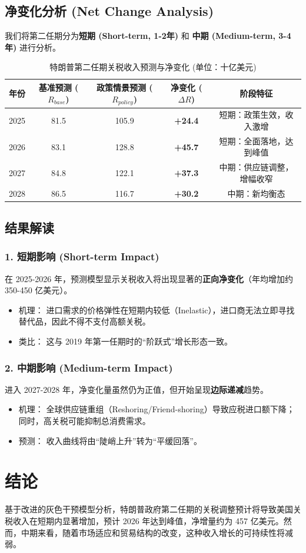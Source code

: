 \documentclass[a4paper,12pt]{article}
\begin{document}
\subsection{净变化分析 (Net Change Analysis)}

我们将第二任期分为\textbf{短期 (Short-term, 1-2年)} 和 \textbf{中期 (Medium-term, 3-4年)} 进行分析。

\begin{table}[H]
    \centering
    \caption{特朗普第二任期关税收入预测与净变化 (单位：十亿美元)}
    \label{tab:prediction}
    \begin{tabular}{ccccc}
        \toprule
        \textbf{年份} & \textbf{基准预测 ($R_{base}$)} & \textbf{政策情景预测 ($R_{policy}$)} & \textbf{净变化 ($\Delta R$)} & \textbf{阶段特征} \\
        \midrule
        2025 & 81.5 & 105.9 & \textbf{+24.4} & 短期：政策生效，收入激增 \\
        2026 & 83.1 & 128.8 & \textbf{+45.7} & 短期：全面落地，达到峰值 \\
        2027 & 84.8 & 122.1 & \textbf{+37.3} & 中期：供应链调整，增幅收窄 \\
        2028 & 86.5 & 116.7 & \textbf{+30.2} & 中期：新均衡态 \\
        \bottomrule
    \end{tabular}
\end{table}

\subsection{结果解读}

\subsubsection{1. 短期影响 (Short-term Impact)}
在 2025-2026 年，预测模型显示关税收入将出现显著的\textbf{正向净变化}（年均增加约 350-450 亿美元）。
\begin{itemize}
    \item 机理： 进口需求的价格弹性在短期内较低（Inelastic），进口商无法立即寻找替代品，因此不得不支付高额关税。
    \item 类比： 这与 2019 年第一任期时的“阶跃式”增长形态一致。
\end{itemize}

\subsubsection{2. 中期影响 (Medium-term Impact)}
进入 2027-2028 年，净变化量虽然仍为正值，但开始呈现\textbf{边际递减}趋势。
\begin{itemize}
    \item 机理： 全球供应链重组（Reshoring/Friend-shoring）导致应税进口额下降；同时，高关税可能抑制总消费需求。
    \item 预测： 收入曲线将由“陡峭上升”转为“平缓回落”。
\end{itemize}

\section{结论}

基于改进的灰色干预模型分析，特朗普政府第二任期的关税调整预计将导致美国关税收入在短期内显著增加，预计 2026 年达到峰值，净增量约为 457 亿美元。然而，中期来看，随着市场适应和贸易结构的改变，这种收入增长的可持续性将减弱。
\end{document}
